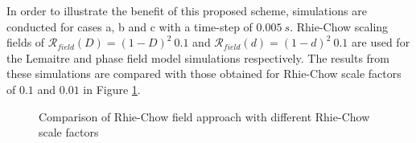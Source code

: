 \documentclass[sn-mathphys,Numbered,draft]{sn-jnl}%
\begin{document}
In order to illustrate the benefit of this proposed scheme, simulations are conducted for cases a, b and c with a time-step of $0.005\ s$. Rhie-Chow scaling fields of $\mathcal{R}_{field}(D)=(1-D)^2\ 0.1$ and $\mathcal{R}_{field}(d)=(1-d)^2\ 0.1$ are used for the Lemaitre and phase field model simulations respectively. The results from these simulations are compared with those obtained for Rhie-Chow scale factors of $0.1$ and $0.01$ in Figure \ref{Rhie-Chow Compare}.

\begin{figure}[t!]
	\centering
		\qquad
				\qquad
	
	\caption{Comparison of Rhie-Chow field approach with different Rhie-Chow scale factors}
	\label{Rhie-Chow Compare}
\end{figure}
\end{document}

